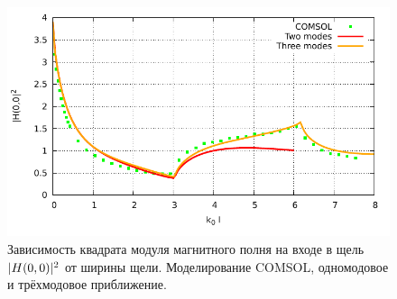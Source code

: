 \begin{figure}
    \centering
    \includegraphics[width=\textwidth]{figures/H00_sim_analytic.pdf}
    \caption{Зависимость квадрата модуля магнитного полня на входе в щель $\lvert H(0,0)\rvert^2$ от ширины щели. Моделирование COMSOL, одномодовое и трёхмодовое приближение.}
    \label{fig:H00_sim_an}
\end{figure}

